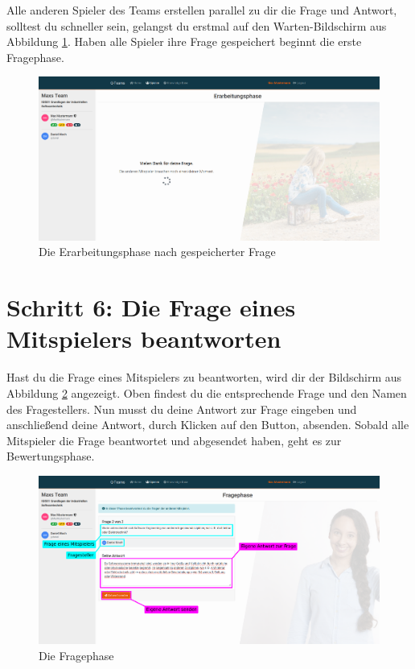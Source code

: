 \documentclass[a4paper,11pt,listof=numbered,glossary=totoc,parskip=half,toc=bib]{scrreprt}
\begin{document}
\begin{appendices}
	Alle anderen Spieler des Teams erstellen parallel zu dir die Frage und Antwort, solltest du schneller sein, gelangst du erstmal auf den Warten-Bildschirm aus Abbildung \ref{fig:guide_erarbeitungsphase_warten}. Haben alle Spieler ihre Frage gespeichert beginnt die erste Fragephase.
	\begin{figure}[h!]
		\centering
		\includegraphics[width=\textwidth]{UserGuide/Erarbeitungsphase_warten.png}
		\caption{Die Erarbeitungsphase nach gespeicherter Frage}
		\label{fig:guide_erarbeitungsphase_warten}
	\end{figure}
	
	\newpage
	\section*{Schritt 6: Die Frage eines Mitspielers beantworten}
	
	Hast du die Frage eines Mitspielers zu beantworten, wird dir der Bildschirm aus Abbildung \ref{fig:guide_fragephase} angezeigt. Oben findest du die entsprechende Frage und den Namen des Fragestellers. Nun musst du deine Antwort zur Frage eingeben und anschließend deine Antwort, durch Klicken auf den Button, absenden. Sobald alle Mitspieler die Frage beantwortet und abgesendet haben, geht es zur Bewertungsphase.	
	\begin{figure}[h!]
		\centering
		\includegraphics[width=\textwidth]{UserGuide/Fragephase_beantworten.png}
		\caption{Die Fragephase}
		\label{fig:guide_fragephase}
	\end{figure}
	

\end{appendices}
\end{document}
